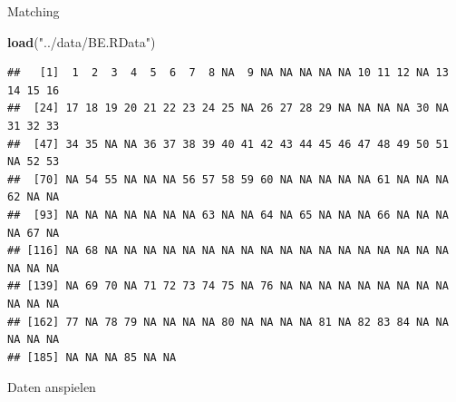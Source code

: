 \documentclass[ignorenonframetext,]{beamer}
\newenvironment{Shaded}{\begin{snugshade}}{\end{snugshade}}
\newcommand{\KeywordTok}[1]{\textcolor[rgb]{0.26,0.66,0.93}{\textbf{#1}}}
\newcommand{\NormalTok}[1]{\textcolor[rgb]{0.74,0.68,0.62}{#1}}
\newcommand{\OperatorTok}[1]{\textcolor[rgb]{0.74,0.68,0.62}{#1}}
\newcommand{\StringTok}[1]{\textcolor[rgb]{0.02,0.61,0.04}{#1}}
\begin{document}
\begin{frame}[fragile]{Matching}
\protect\hypertarget{matching}{}

\begin{Shaded}
\end{Shaded}

\begin{Shaded}
\begin{Highlighting}[]
\KeywordTok{load}\NormalTok{(}\StringTok{"../data/BE.RData"}\NormalTok{)}
\end{Highlighting}
\end{Shaded}

\begin{Shaded}
\end{Shaded}

\begin{verbatim}
##   [1]  1  2  3  4  5  6  7  8 NA  9 NA NA NA NA NA 10 11 12 NA 13 14 15 16
##  [24] 17 18 19 20 21 22 23 24 25 NA 26 27 28 29 NA NA NA NA 30 NA 31 32 33
##  [47] 34 35 NA NA 36 37 38 39 40 41 42 43 44 45 46 47 48 49 50 51 NA 52 53
##  [70] NA 54 55 NA NA NA 56 57 58 59 60 NA NA NA NA NA 61 NA NA NA 62 NA NA
##  [93] NA NA NA NA NA NA NA 63 NA NA 64 NA 65 NA NA NA 66 NA NA NA NA 67 NA
## [116] NA 68 NA NA NA NA NA NA NA NA NA NA NA NA NA NA NA NA NA NA NA NA NA
## [139] NA 69 70 NA 71 72 73 74 75 NA 76 NA NA NA NA NA NA NA NA NA NA NA NA
## [162] 77 NA 78 79 NA NA NA NA 80 NA NA NA NA 81 NA 82 83 84 NA NA NA NA NA
## [185] NA NA NA 85 NA NA
\end{verbatim}

\end{frame}

\begin{frame}[fragile]{Daten anspielen}
\protect\hypertarget{daten-anspielen}{}

\begin{Shaded}
\end{Shaded}

\end{frame}
\end{document}
